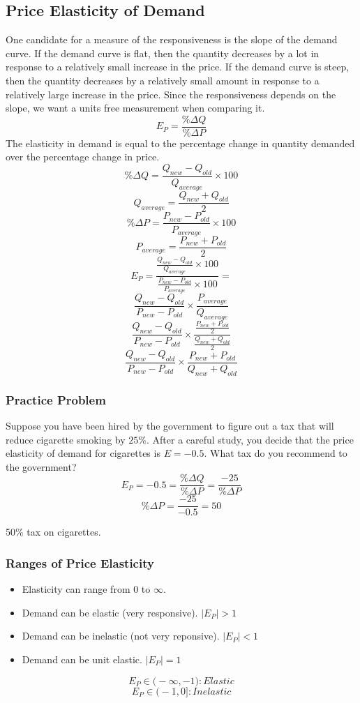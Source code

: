 \documentclass[letterpaper, 12pt]{article}
\begin{document}
\subsection{Price Elasticity of Demand}
One candidate for a measure of the responsiveness is the slope of the demand
curve. If the demand curve is flat, then the quantity decreases by a lot in
response to a relatively small increase in the price. If the demand curve is
steep, then the quantity decreases by a relatively small amount in response to
a relatively large increase in the price. Since the responsiveness depends on
the slope, we want a units free measurement when comparing it.
\[ E_{P} = \frac{\%\Delta Q}{\%\Delta P} \]
The elasticity in demand is equal to the percentage change in quantity demanded
over the percentage change in price.
\[ \%\Delta Q = \frac{Q_{new}-Q_{old}}{Q_{average}}\times 100 \]
\[ Q_{average} = \frac{Q_{new}+Q_{old}}{2} \]
\[ \%\Delta P = \frac{P_{new}-P_{old}}{P_{average}}\times 100 \]
\[ P_{average} = \frac{P_{new}+P_{old}}{2} \]
\[ E_{P} = \frac{\frac{Q_{new}-Q_{old}}{Q_{average}}\times 100}
            {\frac{P_{new}-P_{old}}{P_{average}}\times 100} = \]
\[ \frac{Q_{new}-Q_{old}}{P_{new}-P_{old}}\times
   \frac{P_{average}}{Q_{average}} \]
\[ \frac{Q_{new}-Q_{old}}{P_{new}-P_{old}}\times
   \frac{\frac{P_{new}+P_{old}}{2}}{\frac{Q_{new}+Q_{old}}{2}} \]
\[ \frac{Q_{new}-Q_{old}}{P_{new}-P_{old}}\times
   \frac{P_{new}+P_{old}}{Q_{new}+Q_{old}} \]

\subsubsection{Practice Problem}
Suppose you have been hired by the government to figure out a tax that will
reduce cigarette smoking by \( 25\% \). After a careful study, you decide
that the price elasticity of demand for cigarettes is \( E = -0.5 \). What
tax do you recommend to the government?
\[ E_{P} = -0.5 = \frac{\%\Delta Q}{\%\Delta P} = \frac{-25}{\%\Delta P} \]
\[ \%\Delta P = \frac{-25}{-0.5} = 50 \]
\begin{center}
  50\% tax on cigarettes.
\end{center}

\subsubsection{Ranges of Price Elasticity}
\begin{itemize}
  \item Elasticity can range from \( 0 \) to \( \infty \).
  \item Demand can be elastic (very responsive). \( |E_{P}| > 1 \)
  \item Demand can be inelastic (not very reponsive). \( |E_{P}| < 1 \)
  \item Demand can be unit elastic. \( |E_{P}| = 1 \)
\end{itemize}
\[ E_{P} \in \bigg(-\infty, -1\bigg): Elastic \]
\[ E_{P} \in \bigg(-1, 0\bigg]: Inelastic \]
\end{document}
